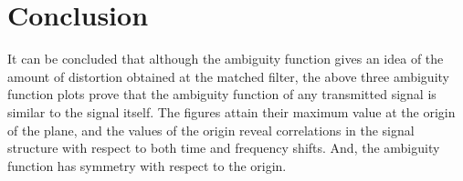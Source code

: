 \chapter*{Conclusion}

\noindent It can be concluded that although the ambiguity function gives an idea of the amount of distortion obtained at the matched filter, the above three ambiguity function plots prove that the ambiguity function of any transmitted signal is similar to the signal itself. The figures attain their maximum value at the origin of the plane, and the values of the origin reveal correlations in the signal structure with respect to both time and frequency shifts. And, the ambiguity function has symmetry with respect to the origin. 

